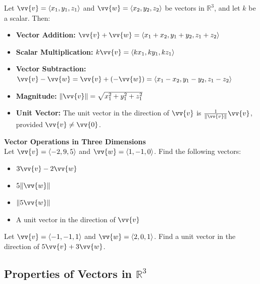 \documentclass{article}
\begin{document}
\begin{definitionbox}
    Let \(\vv{v} = \langle x_1, y_1, z_1 \rangle\) and \(\vv{w} = \langle x_2, y_2, z_2 \rangle\) be vectors in \(\mathbb{R}^3\), and let \(k\) be a scalar. Then:
    \begin{itemize}
        \item \textbf{Vector Addition:} \(\vv{v} + \vv{w} = \langle x_1 + x_2, y_1 + y_2, z_1 + z_2 \rangle\)
        \item \textbf{Scalar Multiplication:} \(k\vv{v} = \langle kx_1, ky_1, kz_1 \rangle\)
        \item \textbf{Vector Subtraction:} \(\vv{v} - \vv{w} = \vv{v} + (-\vv{w}) = \langle x_1 - x_2, y_1 - y_2, z_1 - z_2 \rangle\)
        \item \textbf{Magnitude:} \(\|\vv{v}\| = \sqrt{x_1^2 + y_1^2 + z_1^2}\)
        \item \textbf{Unit Vector:} The unit vector in the direction of \(\vv{v}\) is \(\frac{1}{\|\vv{v}\|} \vv{v}\), provided \(\vv{v} \neq \vv{0}\).
    \end{itemize}
\end{definitionbox}

\begin{exercisebox}
    \textbf{Vector Operations in Three Dimensions} \\
    Let \(\vv{v} = \langle -2, 9, 5 \rangle\) and \(\vv{w} = \langle 1, -1, 0 \rangle\). Find the following vectors:
    \begin{itemize}
        \item \(3\vv{v} - 2\vv{w}\)
        \item \(5\|\vv{w}\|\)
        \item \(\|5\vv{w}\|\)
        \item A unit vector in the direction of \(\vv{v}\)
    \end{itemize}
\end{exercisebox}

\begin{exercisebox}
    Let \(\vv{v} = \langle -1, -1, 1 \rangle\) and \(\vv{w} = \langle 2, 0, 1 \rangle\). Find a unit vector in the direction of \(5\vv{v} + 3\vv{w}\).
\end{exercisebox}

\subsection*{Properties of Vectors in \(\mathbb{R}^3\)}
\end{document}
